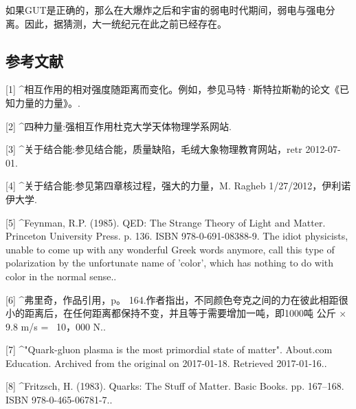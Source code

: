 如果GUT是正确的，那么在大爆炸之后和宇宙的弱电时代期间，弱电与强电分离。因此，据猜测，大一统纪元在此之前已经存在。

\subsection{参考文献}
[1]
^相互作用的相对强度随距离而变化。例如，参见马特·斯特拉斯勒的论文《已知力量的力量》。.

[2]
^四种力量:强相互作用杜克大学天体物理学系网站.

[3]
^关于结合能:参见结合能，质量缺陷，毛绒大象物理教育网站，retr 2012-07-01.

[4]
^关于结合能:参见第四章核过程，强大的力量，M. Ragheb 1/27/2012，伊利诺伊大学.

[5]
^Feynman, R.P. (1985). QED: The Strange Theory of Light and Matter. Princeton University Press. p. 136. ISBN 978-0-691-08388-9. The idiot physicists, unable to come up with any wonderful Greek words anymore, call this type of polarization by the unfortunate name of 'color', which has nothing to do with color in the normal sense..

[6]
^弗里奇，作品引用，p。 164.作者指出，不同颜色夸克之间的力在彼此相距很小的距离后，在任何距离都保持不变，并且等于需要增加一吨，即1000吨 公斤 × 9.8 m/s = ~10，000 N..

[7]
^"Quark-gluon plasma is the most primordial state of matter". About.com Education. Archived from the original on 2017-01-18. Retrieved 2017-01-16..

[8]
^Fritzsch, H. (1983). Quarks: The Stuff of Matter. Basic Books. pp. 167–168. ISBN 978-0-465-06781-7..